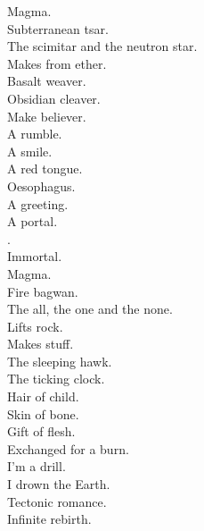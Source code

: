 Magma. \\
Subterranean tsar. \\
The scimitar and the neutron star. \\
Makes from ether. \\
Basalt weaver. \\
Obsidian cleaver. \\
Make believer. \\

A rumble. \\
A smile. \\
A red tongue. \\
Oesophagus. \\
A greeting. \\
A portal. \\
. \\
Immortal. \\

Magma. \\
Fire bagwan. \\
The all, the one and the none. \\
Lifts rock. \\
Makes stuff. \\
The sleeping hawk. \\
The ticking clock. \\
Hair of child. \\
Skin of bone. \\
Gift of flesh. \\
Exchanged for a burn. \\
I'm a drill. \\
I drown the Earth. \\
Tectonic romance. \\
Infinite rebirth. \\

